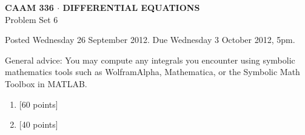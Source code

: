 \documentclass[10pt]{article}
\begin{document}

\begin{center}
\large \textsf{\textbf{CAAM 336 $\cdot$ DIFFERENTIAL EQUATIONS}\\[0.5em]
 Problem Set 6 }
\end{center}

Posted Wednesday 26 September 2012.  Due Wednesday 3 October 2012, 5pm.



General advice: You may compute any integrals you encounter using symbolic mathematics 
tools such as WolframAlpha, Mathematica, or the Symbolic Math Toolbox in MATLAB.


\begin{enumerate}
\item {[60 points]}\\  

\vspace*{1em}
\item {[40 points]}\\  

\end{enumerate}
\end{document}
